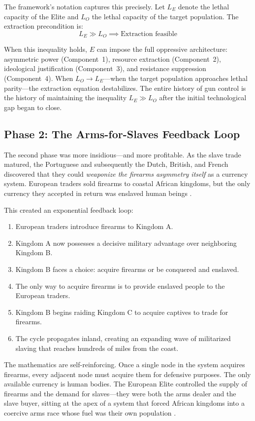 \documentclass[12pt,openany]{book}
\begin{document}
The framework's notation captures this precisely. Let $L_E$ denote the lethal capacity of the Elite and $L_O$ the lethal capacity of the target population. The extraction precondition is:
\[
L_E \gg L_O \implies \text{Extraction feasible}
\]

When this inequality holds, $E$ can impose the full oppressive architecture: asymmetric power (Component~1), resource extraction (Component~2), ideological justification (Component~3), and resistance suppression (Component~4). When $L_O \to L_E$---when the target population approaches lethal parity---the extraction equation destabilizes. The entire history of gun control is the history of maintaining the inequality $L_E \gg L_O$ after the initial technological gap began to close.

\subsection{Phase 2: The Arms-for-Slaves Feedback Loop}

The second phase was more insidious---and more profitable. As the slave trade matured, the Portuguese and subsequently the Dutch, British, and French discovered that they could \textit{weaponize the firearms asymmetry itself} as a currency system. European traders sold firearms to coastal African kingdoms, but the only currency they accepted in return was enslaved human beings \cite{inikori}.

This created an exponential feedback loop:

\begin{enumerate}
    \item European traders introduce firearms to Kingdom A.
    \item Kingdom A now possesses a decisive military advantage over neighboring Kingdom B.
    \item Kingdom B faces a choice: acquire firearms or be conquered and enslaved.
    \item The only way to acquire firearms is to provide enslaved people to the European traders.
    \item Kingdom B begins raiding Kingdom C to acquire captives to trade for firearms.
    \item The cycle propagates inland, creating an expanding wave of militarized slaving that reaches hundreds of miles from the coast.
\end{enumerate}

The mathematics are self-reinforcing. Once a single node in the system acquires firearms, every adjacent node must acquire them for defensive purposes. The only available currency is human bodies. The European Elite controlled the supply of firearms and the demand for slaves---they were both the arms dealer and the slave buyer, sitting at the apex of a system that forced African kingdoms into a coercive arms race whose fuel was their own population \cite{whatley2018}.
\end{document}

